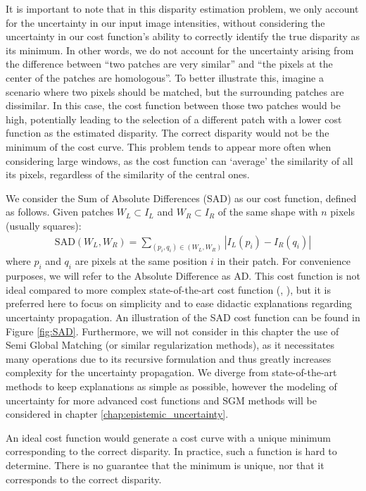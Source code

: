 It is important to note that in this disparity estimation problem, we only account for the uncertainty in our input image intensities, without considering the uncertainty in our cost function's ability to correctly identify the true disparity as its minimum. In other words, we do not account for the uncertainty arising from the difference between ``two patches are very similar'' and ``the pixels at the center of the patches are homologous''. To better illustrate this, imagine a scenario where two pixels should be matched, but the surrounding patches are dissimilar. In this case, the cost function between those two patches would be high, potentially leading to the selection of a different patch with a lower cost function as the estimated disparity. The correct disparity would not be the minimum of the cost curve. This problem tends to appear more often when considering large windows, as the cost function can `average' the similarity of all its pixels, regardless of the similarity of the central ones. 

We consider the Sum of Absolute Differences (SAD) as our cost function, defined as follows. Given patches $W_L\subset I_L$ and $W_R\subset I_R$ of the same shape with $n$ pixels (usually squares):
\begin{align}
    \mathrm{SAD}(W_L, W_R) = \sum_{(p_i, q_i)\in (W_L, W_R)}|I_L(p_i) - I_R(q_i)|\label{eq:SAD}
\end{align}
where $p_i$ and $q_i$ are pixels at the same position $i$ in their patch. For convenience purposes, we will refer to the Absolute Difference as AD. This cost function is not ideal compared to more complex state-of-the-art cost function (\cite{zbontar_stereo_2016}, \cite{laga_survey_2022}), but it is preferred here to focus on simplicity and to ease didactic explanations regarding uncertainty propagation. An illustration of the SAD cost function can be found in Figure \ref{fig:SAD}. Furthermore, we will not consider in this chapter the use of Semi Global Matching (or similar regularization methods), as it necessitates many operations due to its recursive formulation and thus greatly increases complexity for the uncertainty propagation. We diverge from state-of-the-art methods to keep explanations as simple as possible, however the modeling of uncertainty for more advanced cost functions and SGM methods will be considered in chapter \ref{chap:epistemic_uncertainty}.

An ideal cost function would generate a cost curve with a unique minimum corresponding to the correct disparity. In practice, such a function is hard to determine. There is no guarantee that the minimum is unique, nor that it corresponds to the correct disparity. 

